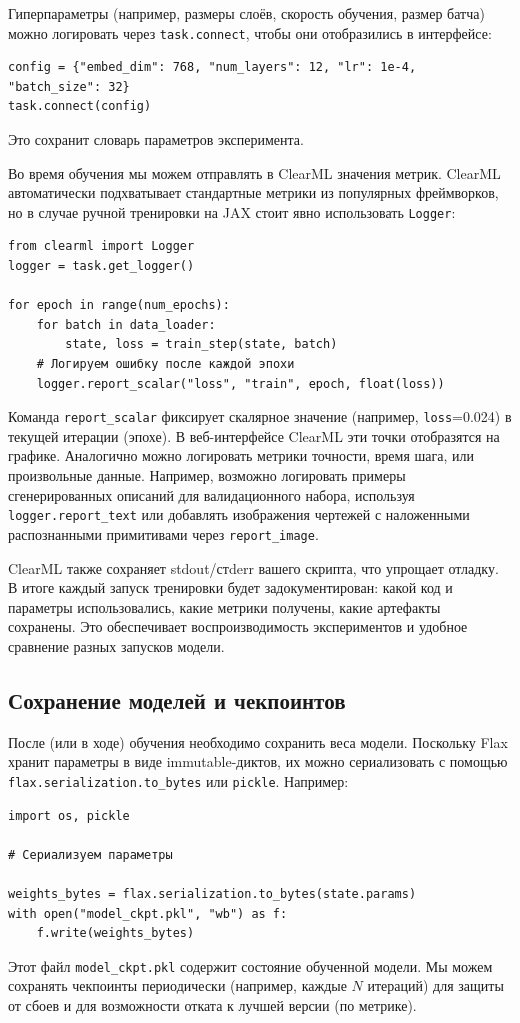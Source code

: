 \documentclass{article}
\begin{document}
Гиперпараметры (например, размеры слоёв, скорость обучения, размер батча) можно логировать через \texttt{task.connect}, чтобы они отобразились в интерфейсе:
\begin{lstlisting}
config = {"embed_dim": 768, "num_layers": 12, "lr": 1e-4, "batch_size": 32}
task.connect(config)
\end{lstlisting}
Это сохранит словарь параметров эксперимента.

Во время обучения мы можем отправлять в ClearML значения метрик. ClearML автоматически подхватывает стандартные метрики из популярных фреймворков, но в случае ручной тренировки на JAX стоит явно использовать \texttt{Logger}:
\begin{lstlisting}
from clearml import Logger
logger = task.get_logger()

for epoch in range(num_epochs):
    for batch in data_loader:
        state, loss = train_step(state, batch)
    # Логируем ошибку после каждой эпохи
    logger.report_scalar("loss", "train", epoch, float(loss))
\end{lstlisting}
Команда \texttt{report_scalar} фиксирует скалярное значение (например, \texttt{loss}=0.024) в текущей итерации (эпохе). В веб-интерфейсе ClearML эти точки отобразятся на графике. Аналогично можно логировать метрики точности, время шага, или произвольные данные. Например, возможно логировать примеры сгенерированных описаний для валидационного набора, используя \texttt{logger.report_text} или добавлять изображения чертежей с наложенными распознанными примитивами через \texttt{report_image}.

ClearML также сохраняет stdout/стderr вашего скрипта, что упрощает отладку. В итоге каждый запуск тренировки будет задокументирован: какой код и параметры использовались, какие метрики получены, какие артефакты сохранены. Это обеспечивает воспроизводимость экспериментов и удобное сравнение разных запусков модели.

\subsection{Сохранение моделей и чекпоинтов}

После (или в ходе) обучения необходимо сохранить веса модели. Поскольку Flax хранит параметры в виде immutable-диктов, их можно сериализовать с помощью \texttt{flax.serialization.to_bytes} или \texttt{pickle}. Например:
\begin{lstlisting}
import os, pickle

# Сериализуем параметры

weights_bytes = flax.serialization.to_bytes(state.params)
with open("model_ckpt.pkl", "wb") as f:
    f.write(weights_bytes)
\end{lstlisting}
Этот файл \texttt{model_ckpt.pkl} содержит состояние обученной модели. Мы можем сохранять чекпоинты периодически (например, каждые $N$ итераций) для защиты от сбоев и для возможности отката к лучшей версии (по метрике).
\end{document}
